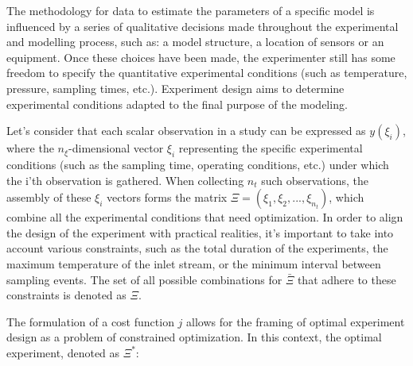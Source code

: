 \documentclass[../Article_Design_of_Experiment.tex]{subfiles}
\begin{document}
	The methodology for data to estimate the parameters of a specific model is influenced by a series of qualitative decisions made throughout the experimental and modelling process, such as: a model structure, a location of sensors or an equipment. Once these choices have been made, the experimenter still has some freedom to specify the quantitative experimental conditions (such as temperature, pressure, sampling times, etc.). Experiment design aims to determine experimental conditions adapted to the final purpose of the modeling. 
	
	
	Let's consider that each scalar observation in a study can be expressed as $y(\xi_i)$, where the $n_\xi$-dimensional vector $\xi_i$ representing the specific experimental conditions (such as the sampling time, operating conditions, etc.) under which the i'th observation is gathered. When collecting $n_t$ such observations, the assembly of these $\xi_i$ vectors forms the matrix $\Xi = (\xi_1, \xi_2,..., \xi_{n_t})$, which combine all the experimental conditions that need optimization. In order to align the design of the experiment with practical realities, it's important to take into account various constraints, such as the total duration of the experiments, the maximum temperature of the inlet stream, or the minimum interval between sampling events. The set of all possible combinations for $\bar{\Xi}$ that adhere to these constraints is denoted as $\Xi$.
	
	
	The formulation of a cost function $j$ allows for the framing of optimal experiment design as a problem of constrained optimization. In this context, the optimal experiment, denoted as $\Xi^*$:
	
\end{document}
